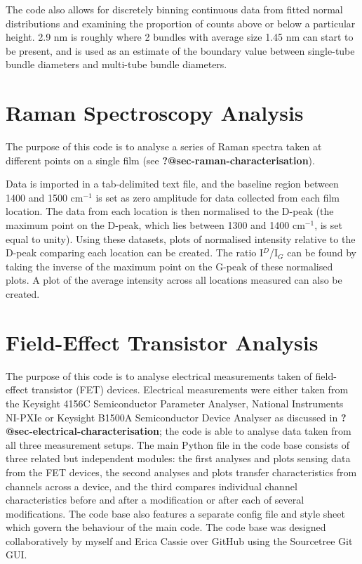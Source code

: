 \documentclass[
  a4paper,
]{scrbook}
\begin{document}
The code also allows for discretely binning continuous data from fitted
normal distributions and examining the proportion of counts above or
below a particular height. 2.9 nm is roughly where 2 bundles with
average size 1.45 nm can start to be present, and is used as an estimate
of the boundary value between single-tube bundle diameters and
multi-tube bundle diameters.

\hypertarget{sec-raman-analysis}{%
\section{Raman Spectroscopy Analysis}\label{sec-raman-analysis}}

The purpose of this code is to analyse a series of Raman spectra taken
at different points on a single film (see
\textbf{?@sec-raman-characterisation}).

Data is imported in a tab-delimited text file, and the baseline region
between 1400 and 1500 cm\(^{-1}\) is set as zero amplitude for data
collected from each film location. The data from each location is then
normalised to the D-peak (the maximum point on the D-peak, which lies
between 1300 and 1400 cm\(^{-1}\), is set equal to unity). Using these
datasets, plots of normalised intensity relative to the D-peak comparing
each location can be created. The ratio I\(^{D}\)/I\(_{G}\) can be found
by taking the inverse of the maximum point on the G-peak of these
normalised plots. A plot of the average intensity across all locations
measured can also be created.

\hypertarget{sec-field-effect-transistor-analysis}{%
\section{Field-Effect Transistor
Analysis}\label{sec-field-effect-transistor-analysis}}

The purpose of this code is to analyse electrical measurements taken of
field-effect transistor (FET) devices. Electrical measurements were
either taken from the Keysight 4156C Semiconductor Parameter Analyser,
National Instruments NI-PXIe or Keysight B1500A Semiconductor Device
Analyser as discussed in \textbf{?@sec-electrical-characterisation}; the
code is able to analyse data taken from all three measurement setups.
The main Python file in the code base consists of three related but
independent modules: the first analyses and plots sensing data from the
FET devices, the second analyses and plots transfer characteristics from
channels across a device, and the third compares individual channel
characteristics before and after a modification or after each of several
modifications. The code base also features a separate config file and
style sheet which govern the behaviour of the main code. The code base
was designed collaboratively by myself and Erica Cassie over GitHub
using the Sourcetree Git GUI.
\end{document}
